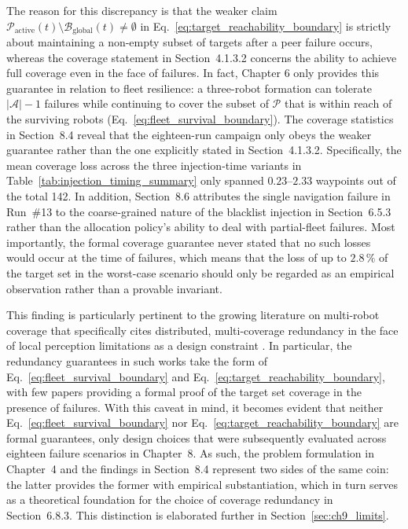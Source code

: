 The reason for this discrepancy is that the weaker claim $\mathcal{P}_{\text{active}}(t) \setminus \mathcal{B}_{\text{global}}(t) \neq \emptyset$ in Eq.~\eqref{eq:target_reachability_boundary} is strictly about maintaining a non-empty subset of targets after a peer failure occurs, whereas the coverage statement in Section~4.1.3.2 concerns the ability to achieve full coverage even in the face of failures. In fact, Chapter 6 only provides this guarantee in relation to fleet resilience: a three-robot formation can tolerate $|\mathcal{A}| - 1$ failures while continuing to cover the subset of $\mathcal{P}$ that is within reach of the surviving robots (Eq.~\eqref{eq:fleet_survival_boundary}). The coverage statistics in Section~8.4 reveal that the eighteen-run campaign only obeys the weaker guarantee rather than the one explicitly stated in Section~4.1.3.2. Specifically, the mean coverage loss across the three injection-time variants in Table~\ref{tab:injection_timing_summary} only spanned $0.23$--$2.33$ waypoints out of the total 142. In addition, Section~8.6 attributes the single navigation failure in Run~\#13 to the coarse-grained nature of the blacklist injection in Section~6.5.3 rather than the allocation policy's ability to deal with partial-fleet failures. Most importantly, the formal coverage guarantee never stated that no such losses would occur at the time of failures, which means that the loss of up to $2.8\,\%$ of the target set in the worst-case scenario should only be regarded as an empirical observation rather than a provable invariant.

This finding is particularly pertinent to the growing literature on multi-robot coverage that specifically cites distributed, multi-coverage redundancy in the face of local perception limitations as a design constraint \cite{guitouni2026distributed}. In particular, the redundancy guarantees in such works take the form of Eq.~\eqref{eq:fleet_survival_boundary} and Eq.~\eqref{eq:target_reachability_boundary}, with few papers providing a formal proof of the target set coverage in the presence of failures. With this caveat in mind, it becomes evident that neither Eq.~\eqref{eq:fleet_survival_boundary} nor Eq.~\eqref{eq:target_reachability_boundary} are formal guarantees, only design choices that were subsequently evaluated across eighteen failure scenarios in Chapter~8. As such, the problem formulation in Chapter~4 and the findings in Section~8.4 represent two sides of the same coin: the latter provides the former with empirical substantiation, which in turn serves as a theoretical foundation for the choice of coverage redundancy in Section~6.8.3. This distinction is elaborated further in Section~\ref{sec:ch9_limits}.

